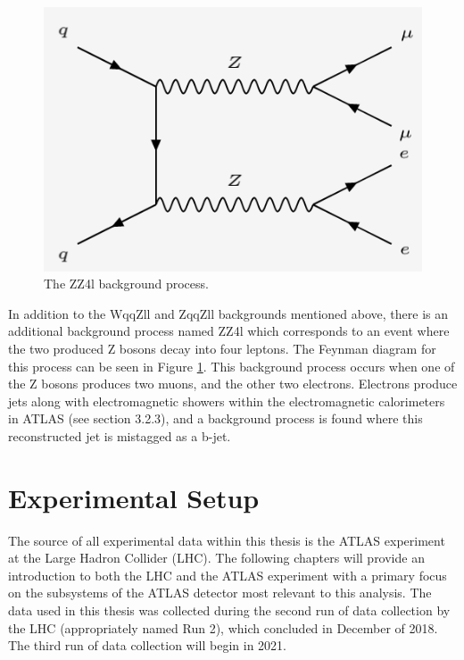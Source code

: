 \documentclass[12pt,a4paper,epsf,portrait,times,epsfig]{report}
\begin{document}
		\begin{figure}[h!]
			\centering
			\includegraphics[scale=0.45]{ZZ4l}
			\caption{The ZZ4l background process.}
			\label{Fig:ZZ4lFeynman}
		\end{figure}
		
		
		In addition to the WqqZll and ZqqZll backgrounds mentioned above, there is an additional background process named ZZ4l which corresponds to an event where the two produced Z bosons decay into four leptons. The Feynman diagram for this process can be seen in Figure \ref{Fig:ZZ4lFeynman}. This background process occurs when one of the Z bosons produces two muons, and the other two electrons. Electrons produce jets along with
		electromagnetic showers within the electromagnetic calorimeters in ATLAS (see section 3.2.3), and a background process is found where this reconstructed jet is mistagged as a b-jet. \par
		
	\newpage

	\chapter{Experimental Setup}

		The source of all experimental data within this thesis is the ATLAS experiment at the Large Hadron Collider (LHC). The following chapters will provide an introduction to both the LHC and the ATLAS experiment with a primary focus on the subsystems of the ATLAS detector most relevant to this analysis. The data used in this thesis was collected during the second run of data collection by the LHC (appropriately named Run 2), which concluded in December of 2018. The third run of data collection will begin in 2021. 
\end{document}

